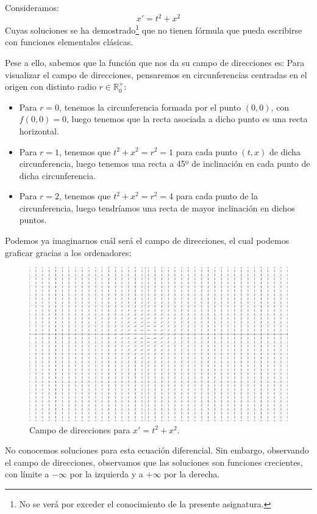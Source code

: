 \begin{ejemplo}
    Consideramos:
    \begin{equation*}
        x' = t^2 + x^2
    \end{equation*}
    Cuyas soluciones se ha demostrado\footnote{No se verá por exceder el conocimiento de la presente asignatura.} que no tienen fórmula que pueda escribirse con funciones elementales clásicas.

    Pese a ello, sabemos que la función que nos da su campo de direcciones es:
    Para visualizar el campo de direcciones, pensaremos en circunferencias centradas en el origen con distinto radio $r\in \mathbb{R}^+_0$:
    \begin{itemize}
        \item Para $r = 0$, tenemos la circunferencia formada por el punto $(0,0)$, con $f(0,0) = 0$, luego tenemos que la recta asociada a dicho punto es una recta horizontal.
        \item Para $r = 1$, tenemos que $t^2 + x^2 = r^2 = 1$ para cada punto $(t,x)$ de dicha circunferencia, luego tenemos una recta a 45º de inclinación en cada punto de dicha circunferencia.
        \item Para $r = 2$, tenemos que $t^2 + x^2 = r^2 = 4$ para cada punto de la circunferencia, luego tendríamos una recta de mayor inclinación en dichos puntos.
    \end{itemize}
    Podemos ya imaginarnos cuál será el campo de direcciones, el cual podemos graficar gracias a los ordenadores:
\ifdefined\showimages
    \begin{figure}[H]
        \centering
        \includegraphics[width=0.6\linewidth]{Imagenes/campo_direcciones_4.png}
        \caption{Campo de direcciones para $x'=t^2+x^2$.}
    \end{figure}
\fi
    No conocemos soluciones para esta ecuación diferencial. Sin embargo, observando el campo de direcciones, observamos que las soluciones son funciones crecientes, con límite a $-\infty$ por la izquierda y a $+\infty$ por la derecha.
\end{ejemplo}

